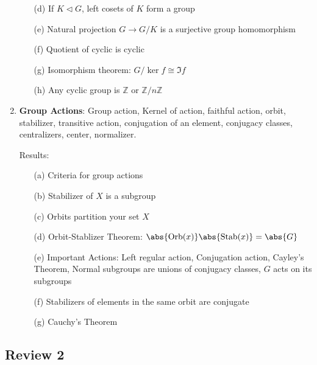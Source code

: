 \documentclass{article}
\begin{document}
\begin{enumerate}
\begin{enumerate}
		\item [(d)] If $K \triangleleft G$, left cosets of $K$ form a group

		\item [(e)] Natural projection $G \rightarrow G/K$ is a surjective group homomorphism

		\item [(f)] Quotient of cyclic is cyclic

		\item [(g)] Isomorphism theorem: $G/\ker{f} \cong \Im{f}$

		\item [(h)] Any cyclic group is $\mathbb{Z}$ or $\mathbb{Z}/n\mathbb{Z}$
	\end{enumerate}

	\item \textbf{Group Actions}: Group action, Kernel of action, faithful action, orbit, stabilizer, transitive action, conjugation of an element, conjugacy classes, centralizers, center, normalizer.

	Results:
	\begin{enumerate}
		\item [(a)] Criteria for group actions

		\item [(b)] Stabilizer of $X$ is a subgroup

		\item [(c)] Orbits partition your set $X$

		\item [(d)] Orbit-Stablizer Theorem: $\abs{\text{Orb}(x)}\abs{\text{Stab}(x)} = \abs{G}$

		\item [(e)] Important Actions: Left regular action, Conjugation action, Cayley's Theorem, Normal subgroups are unions of conjugacy classes, $G$ acts on its subgroups

		\item [(f)] Stabilizers of elements in the same orbit are conjugate

		\item [(g)] Cauchy's Theorem
	\end{enumerate}
\end{enumerate}

\begin{topic}
	\section*{Review 2}
\end{topic}
\end{document}
